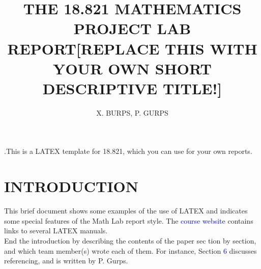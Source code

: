 \documentclass{article}
\title{THE 18.821 MATHEMATICS PROJECT LAB REPORT[REPLACE THIS WITH YOUR OWN SHORT DESCRIPTIVE TITLE!]}
\author{X. BURPS, P. GURPS}
\begin{document}
	\maketitle
	\abstractname .This is a LATEX template for 18.821, which you can use  for your own reports.
	\vspace{0.001cm}
	\centering
	\section{\small INTRODUCTION}
	\vspace{0.001cm}
	This brief document shows some examples of the use of LATEX and
	indicates some special features of the Math Lab report style. The
	\textcolor{blue}{course website} contains links to several LATEX manuals.\\
	End the introduction by describing the contents of the paper sec­
	tion by section, and which team member(s) wrote each of them. For
	instance, Section \textcolor{blue}{6} discusses referencing, and is written by P. Gurps.
	\vspace{0.001cm}
	\centering
\end{document}

